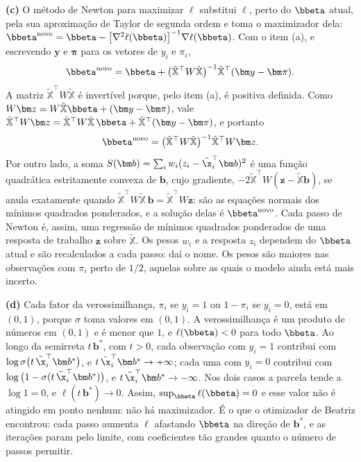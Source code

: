 \begin{solucao}
\smallskip
\textbf{(c)} O método de Newton para maximizar $\ell$ substitui $\ell$, perto do $\bbeta$
atual, pela sua aproximação de Taylor de segunda ordem e toma o maximizador dela:
$\bbeta^{\mathrm{novo}}=\bbeta-\big[\nabla^2\ell(\bbeta)\big]^{-1}\nabla\ell(\bbeta)$. Com o
item (a), e escrevendo $\bm y$ e $\bm\pi$ para os vetores de $y_i$ e $\pi_i$,
\[
  \bbeta^{\mathrm{novo}}
  =\bbeta+\big(\tilde{\mathbb X}^\top W\tilde{\mathbb X}\big)^{-1}\tilde{\mathbb X}^\top(\bm y-\bm\pi).
\]
A matriz $\tilde{\mathbb X}^\top W\tilde{\mathbb X}$ é invertível porque, pelo item (a),
é positiva definida. Como $W\bm z=W\tilde{\mathbb X}\bbeta+(\bm y-\bm\pi)$, vale
$\tilde{\mathbb X}^\top W\bm z=\tilde{\mathbb X}^\top W\tilde{\mathbb X}\,\bbeta
+\tilde{\mathbb X}^\top(\bm y-\bm\pi)$, e portanto
\[
  \bbeta^{\mathrm{novo}}=\big(\tilde{\mathbb X}^\top W\tilde{\mathbb X}\big)^{-1}\tilde{\mathbb X}^\top W\bm z .
\]
Por outro lado, a soma $S(\bm b)=\sum_iw_i(z_i-\tilde\x_i^\top\bm b)^2$ é uma função
quadrática estritamente convexa de $\bm b$, cujo gradiente,
$-2\tilde{\mathbb X}^\top W(\bm z-\tilde{\mathbb X}\bm b)$, se anula exatamente quando
$\tilde{\mathbb X}^\top W\tilde{\mathbb X}\,\bm b=\tilde{\mathbb X}^\top W\bm z$: são as
equações normais dos mínimos quadrados ponderados, e a solução delas é
$\bbeta^{\mathrm{novo}}$. Cada passo de Newton é, assim, uma regressão de mínimos quadrados
ponderados de uma resposta de trabalho $\bm z$ sobre $\tilde{\mathbb X}$. Os pesos $w_i$ e
a resposta $z_i$ dependem do $\bbeta$ atual e são recalculados a cada passo: daí o nome. Os
pesos são maiores nas observações com $\pi_i$ perto de $1/2$, aquelas sobre as quais o
modelo ainda está mais incerto.

\smallskip
\textbf{(d)} Cada fator da verossimilhança, $\pi_i$ se $y_i=1$ ou $1-\pi_i$ se $y_i=0$, está
em $(0,1)$, porque $\sigma$ toma valores em $(0,1)$. A verossimilhança é um produto de
números em $(0,1)$ e é menor que $1$, e $\ell(\bbeta)<0$ para todo $\bbeta$. Ao longo da
semirreta $t\,\bm b^*$, com $t>0$, cada observação com $y_i=1$ contribui com
$\log\sigma\big(t\,\tilde\x_i^\top\bm b^*\big)$, e $t\,\tilde\x_i^\top\bm b^*\to+\infty$;
cada uma com $y_i=0$ contribui com $\log\big(1-\sigma(t\,\tilde\x_i^\top\bm b^*)\big)$, e
$t\,\tilde\x_i^\top\bm b^*\to-\infty$. Nos dois casos a parcela tende a $\log1=0$, e
$\ell(t\,\bm b^*)\to0$. Assim, $\sup_{\bbeta}\ell(\bbeta)=0$ e esse valor não é atingido em
ponto nenhum: não há maximizador. É o que o otimizador de Beatriz encontrou: cada passo
aumenta $\ell$ afastando $\bbeta$ na direção de $\bm b^*$, e as iterações param pelo limite,
com coeficientes tão grandes quanto o número de passos permitir.


\end{solucao}
